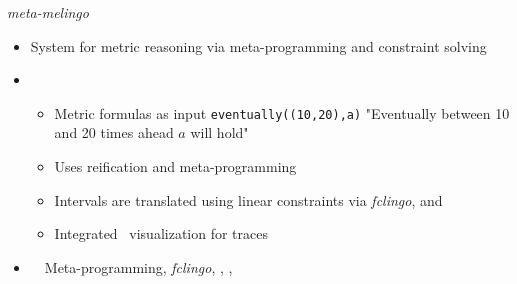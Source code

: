 \begin{frame}{\textit{meta-melingo}}
  \begin{itemize}
    \item {} System for metric reasoning via meta-programming and constraint solving
    \item {} 
      \begin{itemize}
      \item Metric formulas as input \texttt{eventually((10,20),a)} "Eventually between 10 and 20 times ahead $a$ will hold"
      \item Uses reification and meta-programming
      \item Intervals are translated using linear constraints via \textit{fclingo}, \clingodl and \clingcon
      \item Integrated \clingraph\ visualization for traces
      \end{itemize}
    \item {} \ \clingo\ Meta-programming, \textit{fclingo}, \clingodl, \clingcon, \clingraph
  \end{itemize}
\end{frame}
%
